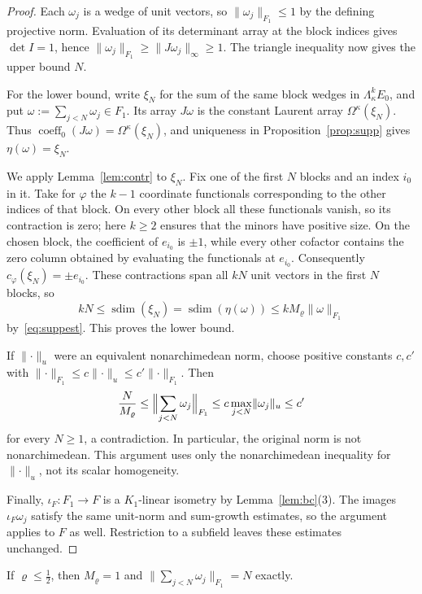 \documentclass[11pt]{amsart}
\theoremstyle{definition}
\theoremstyle{remark}
\numberwithin{equation}{section}
\newcommand{\norm}[1]{\lVert #1\rVert}
\newcommand{\coeff}{\operatorname{coeff}}
\newcommand{\sdim}{\operatorname{sdim}}
\theoremstyle{plain}
\theoremstyle{definition}
\theoremstyle{plain}
\begin{document}
\begin{proof}
Each $\omega_j$ is a wedge of unit vectors, so $\norm{\omega_j}_{F_1}\le1$ by the defining projective norm. Evaluation
of its determinant array at the block indices gives $\det I=1$, hence
$\norm{\omega_j}_{F_1}\ge\norm{J\omega_j}_\infty\ge1$. The triangle inequality now gives the upper bound $N$.

For the lower bound, write $\xi_N$ for the sum of the same block wedges in $\Lambda^k_\kappa E_0$, and put
$\omega:=\sum_{j<N}\omega_j\in F_1$. Its array $J\omega$ is the constant Laurent array $\Omega^\kappa(\xi_N)$.
Thus $\coeff_0(J\omega)=\Omega^\kappa(\xi_N)$, and uniqueness in Proposition~\ref{prop:supp} gives
$\eta(\omega)=\xi_N$.

We apply Lemma~\ref{lem:contr} to $\xi_N$. Fix one of the first $N$ blocks and an index $i_0$ in it. Take for
$\varphi$ the $k-1$ coordinate functionals corresponding to the other indices of that block. On every other
block all these functionals vanish, so its contraction is zero; here $k\ge2$ ensures that the minors have
positive size. On the chosen block, the coefficient of $e_{i_0}$ is $\pm1$, while every other cofactor contains
the zero column obtained by evaluating the functionals at $e_{i_0}$. Consequently
$c_\varphi(\xi_N)=\pm e_{i_0}$. These contractions span all $kN$ unit vectors in the first $N$ blocks, so
\[
kN\le\sdim(\xi_N)=\sdim(\eta(\omega))\le kM_\varrho\norm\omega_{F_1}
\]
by~\eqref{eq:suppest}. This proves the lower bound.

If $\norm\cdot_u$ were an equivalent nonarchimedean norm, choose positive constants $c,c'$ with
$\norm\cdot_{F_1}\le c\norm\cdot_u\le c'\norm\cdot_{F_1}$. Then
\[
\frac{N}{M_\varrho}\le\Bigl\lVert\sum_{j<N}\omega_j\Bigr\rVert_{F_1}
\le c\max_{j<N}\norm{\omega_j}_u\le c'
\]
for every $N\ge1$, a contradiction. In particular, the original norm is not nonarchimedean. This argument uses
only the nonarchimedean inequality for $\norm\cdot_u$, not its scalar homogeneity.

Finally, $\iota_F\colon F_1\to F$ is a $K_1$\nobreakdash-linear isometry by Lemma~\ref{lem:bc}(3). The images
$\iota_F\omega_j$ satisfy the same unit-norm and sum-growth estimates, so the argument applies to $F$ as well.
Restriction to a subfield leaves these estimates unchanged.
\end{proof}

If $\varrho\le\frac12$, then $M_\varrho=1$ and $\norm{\sum_{j<N}\omega_j}_{F_1}=N$ exactly.
\end{document}
